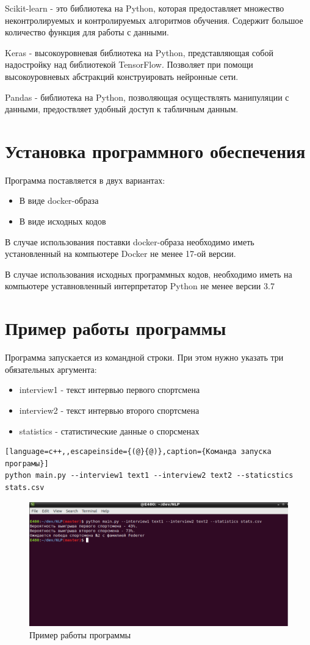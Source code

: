 Scikit-learn - это библиотека на Python, которая предоставляет множество неконтролируемых и контролируемых алгоритмов обучения. Содержит большое количество функция для работы  с данными.

Keras - высокоуровневая библиотека на Python, представляющая собой надостройку над библиотекой TensorFlow. Позволяет при помощи высокоуровневых абстракций конструировать нейронные сети.

Pandas - библиотека на Python, позволяющая осуществлять манипуляции с данными, предоствляет удобный доступ к табличным данным.
\section{Установка программного обеспечения}
Программа поставляется в двух вариантах:
\begin{itemize}
	\item В виде docker-образа
	\item В виде исходных кодов
\end{itemize}
В случае использования поставки docker-образа необходимо иметь установленный на компьютере Docker не менее 17-ой версии.

В случае использования исходных программных кодов, необходимо иметь на компьютере уставновленный интерпретатор Python не менее версии 3.7


\section{Пример работы программы}
Программа запускается из командной строки. При этом нужно указать три обязательных аргумента:
\begin{itemize}
	\item interview1 - текст интервью первого спортсмена
	\item interview2 - текст интервью второго спортсмена
	\item statistics - статистические данные о спорсменах
\end{itemize}
\begin{lstlisting}[language=c++,,escapeinside={(@}{@)},caption={Команда запуска програмы}] 
python main.py --interview1 text1 --interview2 text2 --staticstics stats.csv
\end{lstlisting}
\begin{figure}[!h]
	\centering
	\includegraphics[scale=0.5]{master_img/sample_program.png}
	\caption{Пример работы программы}
	\label{fig10}
\end{figure}